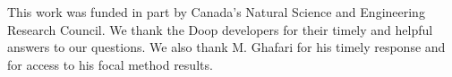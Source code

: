 \documentclass[sigconf,review,anonymous]{acmart}
\begin{document}












\begin{acks} 
This work was funded in part by Canada's Natural Science and Engineering Research Council.
We thank the Doop developers for their timely and helpful answers to our questions. %
We also thank M. Ghafari for his timely response and for access to his focal method results. 
\end{acks}



\end{document}
